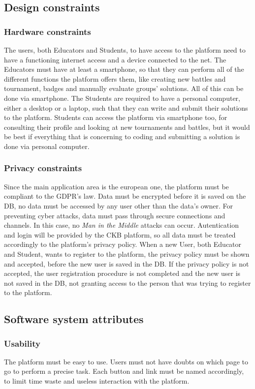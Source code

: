 \documentclass{article}
\begin{document}
{\subsection{Design constraints}
\subsubsection{Hardware constraints}
The users, both Educators and Students, to have access to the platform need to have a functioning internet access and a device connected to the net.
The Educators must have at least a smartphone, so that they can perform all of the different functions the platform offers them, like creating new battles
and tournament, badges and manually evaluate groups' solutions. All of this can be done via smartphone.
The Students are required to have a personal computer, either a desktop or a laptop, such that they can write and submit their solutions to the platform.
Students can access the platform via smartphone too, for consulting their profile and looking at new tournaments and battles, but it would be
best if everything that is concerning to coding and submitting a solution is done via personal computer.
\subsubsection{Privacy constraints}
Since the main application area is the european one, the platform must be compliant to the GDPR's law.
Data must be encrypted before it is saved on the DB, no data must be accessed by any user other than the data's owner.
For preventing cyber attacks, data must pass through secure connections and channels. In this case, no \textit{Man in the Middle} attacks can occur.
Autentication and login will be provided by the CKB platform, so all data must be treated accordingly to the platform's privacy policy.
When a new User, both Educator and Student, wants to register to the platform, the privacy policy must be shown and 
accepted, before the new user is saved in the DB.
If the privacy policy is not accepted, the user registration procedure is not completed and
 the new user is not saved in the DB, not granting access to the person that was
trying to register to the platform.
\subsection{Software system attributes}
\subsubsection{Usability}
The platform must be easy to use. Users must not have doubts on which page to go to perform a precise task.
Each button and link must be named accordingly, to limit time waste and useless interaction with the platform.
}
\end{document}
